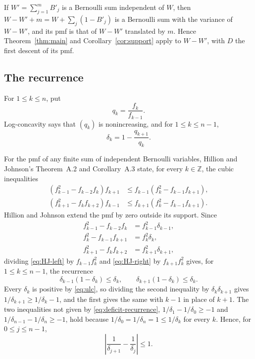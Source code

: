 \documentclass[ECP,preprint]{ejpecp}
\begin{document}
If $W'=\sum_{j=1}^mB'_j$ is a Bernoulli sum independent of $W$, then
$W-W'+m=W+\sum_{j}(1-B'_j)$ is a Bernoulli sum with the variance of $W-W'$,
and its pmf is that of $W-W'$ translated by $m$. Hence
Theorem~\ref{thm:main} and Corollary~\ref{cor:support} apply to $W-W'$, with
$D$ the first descent of its pmf.

\subsection{The recurrence}

For $1\leq k\leq n$, put
\[
  q_k=\frac{f_k}{f_{k-1}}.
\]
Log-concavity says that $(q_k)$ is nonincreasing, and for
$1\leq k\leq n-1$,
\begin{equation}\label{eq:delta-ratio}
  \delta_k=1-\frac{q_{k+1}}{q_k}.
\end{equation}

For the pmf of any finite sum of independent Bernoulli variables, Hillion and
Johnson's Theorem~A.2 and Corollary~A.3 state, for every $k\in\mathbb Z$,
the cubic inequalities \cite[equations~(78)--(79)]{hillionjohnson2016}
\begin{align}
  (f_{k-1}^2-f_{k-2}f_k)f_{k+1}
  &\leq f_{k-1}(f_k^2-f_{k-1}f_{k+1}),
  \label{eq:HJ-left}\\
  (f_{k+1}^2-f_kf_{k+2})f_{k-1}
  &\leq f_{k+1}(f_k^2-f_{k-1}f_{k+1}).
  \label{eq:HJ-right}
\end{align}
Hillion and Johnson extend the pmf by zero outside its support. Since
\[
\begin{aligned}
  f_{k-1}^2-f_{k-2}f_k&=f_{k-1}^2\delta_{k-1},\\
  f_k^2-f_{k-1}f_{k+1}&=f_k^2\delta_k,\\
  f_{k+1}^2-f_kf_{k+2}&=f_{k+1}^2\delta_{k+1},
\end{aligned}
\]
dividing \eqref{eq:HJ-left} by $f_{k-1}f_k^2$ and \eqref{eq:HJ-right} by
$f_{k+1}f_k^2$ gives, for $1\leq k\leq n-1$, the recurrence
\begin{equation}\label{eq:deficit-recurrence}
  \delta_{k-1}(1-\delta_k)\leq\delta_k,
  \qquad
  \delta_{k+1}(1-\delta_k)\leq\delta_k.
\end{equation}
Every $\delta_k$ is positive by \eqref{eq:ulc}, so dividing the second
inequality by $\delta_k\delta_{k+1}$ gives $1/\delta_{k+1}\geq1/\delta_k-1$,
and the first gives the same with $k-1$ in place of $k+1$. The two
inequalities not given by \eqref{eq:deficit-recurrence},
$1/\delta_1-1/\delta_0\geq-1$ and $1/\delta_{n-1}-1/\delta_n\geq-1$, hold
because $1/\delta_0=1/\delta_n=1\leq1/\delta_k$ for every $k$. Hence, for
$0\leq j\leq n-1$,
\begin{equation}\label{eq:reciprocal}
  \left|\frac1{\delta_{j+1}}-\frac1{\delta_j}\right|\leq1.
\end{equation}
\end{document}
